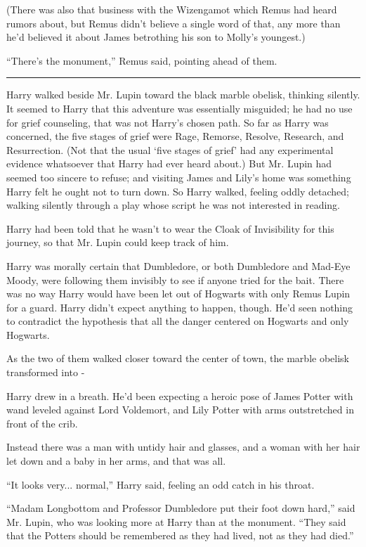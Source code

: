 (There was also that business with the Wizengamot which Remus had heard
rumors about, but Remus didn't believe a single word of that, any more
than he'd believed it about James betrothing his son to Molly's
youngest.)

``There's the monument,'' Remus said, pointing ahead of them.

\begin{center}\rule{3in}{0.4pt}\end{center}

Harry walked beside Mr. Lupin toward the black marble obelisk, thinking
silently. It seemed to Harry that this adventure was essentially
misguided; he had no use for grief counseling, that was not Harry's
chosen path. So far as Harry was concerned, the five stages of grief
were Rage, Remorse, Resolve, Research, and Resurrection. (Not that the
usual `five stages of grief' had any experimental evidence whatsoever
that Harry had ever heard about.) But Mr. Lupin had seemed too sincere
to refuse; and visiting James and Lily's home was something Harry felt
he ought not to turn down. So Harry walked, feeling oddly detached;
walking silently through a play whose script he was not interested in
reading.

Harry had been told that he wasn't to wear the Cloak of Invisibility for
this journey, so that Mr. Lupin could keep track of him.

Harry was morally certain that Dumbledore, or both Dumbledore and
Mad-Eye Moody, were following them invisibly to see if anyone tried for
the bait. There was no way Harry would have been let out of Hogwarts
with only Remus Lupin for a guard. Harry didn't expect anything to
happen, though. He'd seen nothing to contradict the hypothesis that all
the danger centered on Hogwarts and only Hogwarts.

As the two of them walked closer toward the center of town, the marble
obelisk transformed into -

Harry drew in a breath. He'd been expecting a heroic pose of James
Potter with wand leveled against Lord Voldemort, and Lily Potter with
arms outstretched in front of the crib.

Instead there was a man with untidy hair and glasses, and a woman with
her hair let down and a baby in her arms, and that was all.

``It looks very... normal,'' Harry said, feeling an odd catch in
his throat.

``Madam Longbottom and Professor Dumbledore put their foot down hard,''
said Mr. Lupin, who was looking more at Harry than at the monument.
``They said that the Potters should be remembered as they had lived, not
as they had died.''

